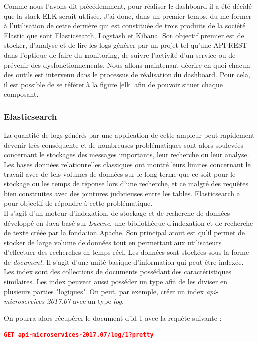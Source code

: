 	Comme nous l'avons dit précédemment, pour réaliser le dashboard il a été décidé que la stack ELK serait utilisée. J'ai donc, dans un premier temps, du me former à l'utilisation de cette dernière qui est constituée de trois produits de la société Elastic que sont Elasticsearch, Logstash et Kibana. Son objectif premier est de stocker, d'analyse et de lire les logs générer par un projet tel qu'une API REST dans l'optique de faire du monitoring, de suivre l'activité d'un service ou de prévenir des dysfonctionnements. Nous allons maintenant décrire en quoi chacun des outils est intervenu dans le processus de réalisation du dashboard. Pour cela, il est possible de se référer à la figure \ref{elk} afin de pouvoir situer chaque composant.

	\subsubsection{Elasticsearch}
	La quantité de logs générés par une application de cette ampleur peut rapidement devenir très conséquente et de nombreuses problématiques sont alors soulevées concernant le stockages des messages importants, leur recherche ou leur analyse. Les bases données relationnelles classiques ont montré leurs limites concernant le travail avec de tels volumes de données sur le long terme que ce soit pour le stockage ou les temps de réponse lors d'une recherche, et ce malgré des requêtes bien construites avec des jointures judicieuses entre les tables. Elasticsearch a pour objectif de répondre à cette problématique. \\
	
	Il s'agit d'un moteur d'indexation, de stockage et de recherche de données développé en Java basé sur \textit{Lucene}, une bibliothèque d'indexation et de recherche de texte créée par la fondation Apache. Son principal atout est qu'il permet de stocker de large volume de données tout en permettant aux utilisateurs d'effectuer des recherches en temps réel. Les données sont stockées sous la forme de \textit{document}. Il s'agit d'une unité basique d'information qui peut être indexée. Les index sont des collections de documents possédant des caractéristiques similaires. Les index peuvent aussi posséder un type afin de les diviser en plusieurs parties "logiques". On peut, par exemple, créer un index \textit{api-microservices-2017.07} avec un type \textit{log}. 
	
	On pourra alors récupérer le document d'id 1 avec la requête suivante :	

\begin{lstlisting}[language=json]
 GET api-microservices-2017.07/log/1?pretty
 \end{lstlisting}
	
